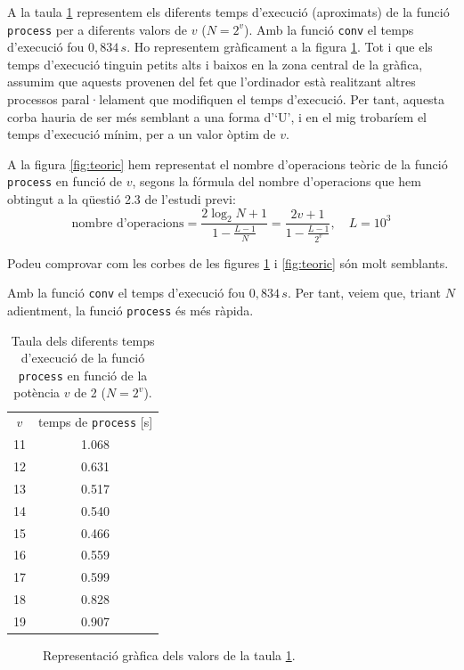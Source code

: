 \documentclass[11pt,a4]{article}
\numberwithin{equation}{section}
\theoremstyle{thmstyle}
\theoremstyle{thmstyle}
\theoremstyle{thmstyle}
\theoremstyle{thmstyle}
\theoremstyle{thmstyle}
\theoremstyle{thmstyle}
\theoremstyle{thmstyle}
\begin{document}
A la taula \ref{tb:temps} representem els diferents temps d'execució (aproximats) de la funció {\tt process} per a diferents valors de $v$ ($N = 2^v$). Amb la funció {\tt conv} el temps d'execució fou $0,834\, s$. Ho representem gràficament a la figura \ref{fig:temps}. Tot i que els temps d'execució tinguin petits alts i baixos en la zona central de la gràfica, assumim que aquests provenen del fet que l'ordinador està realitzant altres processos paral·lelament que modifiquen el temps d'execució. Per tant, aquesta corba hauria de ser més semblant a una forma d'`U', i en el mig trobaríem el temps d'execució mínim, per a un valor òptim de $v$.

A la figura \ref{fig:teoric} hem representat el nombre d'operacions teòric de la funció {\tt process} en funció de $v$, segons la fórmula del nombre d'operacions que hem obtingut a la qüestió 2.3 de l'estudi previ:
$$
\text{nombre d'operacions} = \frac{2\log_2 N + 1}{1-\frac{L-1}{N}} =
\frac{2v + 1}{1-\frac{L-1}{2^v}}, \quad L = 10^3
$$

Podeu comprovar com les corbes de les figures \ref{fig:temps} i \ref{fig:teoric} són molt semblants.

Amb la funció {\tt conv} el temps d'execució fou $0,834\, s$. Per tant, veiem que, triant $N$ adientment, la funció {\tt process} és més ràpida.

\begin{table}
\centering
\begin{tabular}{|c|c|}
\hline
$v$       & temps de {\tt process} [s]  \\
11        & 1.068             \\
12        & 0.631             \\
13        & 0.517             \\
14        & 0.540             \\
15        & 0.466             \\
16        & 0.559             \\
17        & 0.599             \\
18        & 0.828             \\
19        & 0.907             \\
\hline
\end{tabular}
\caption{Taula dels diferents temps d'execució de la funció {\tt process} en funció de la potència $v$ de 2 ($N = 2^v$).}
\label{tb:temps}
\end{table}

\begin{figure}[h]
\centering
{}
\caption{Representació gràfica dels valors de la taula \ref{tb:temps}.}
\label{fig:temps}
\end{figure}
\end{document}
